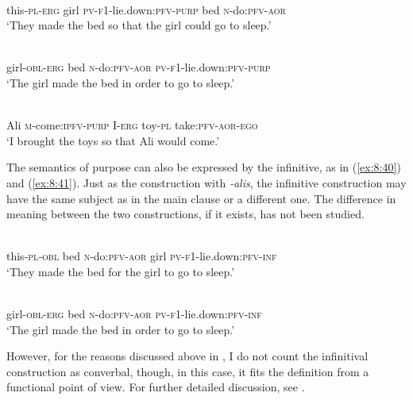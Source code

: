 ﻿\documentclass[output=paper]{langsci/langscibook}
\begin{document}
\ea \label{ex:8:37} %
\\
this-\textsc{pl}-\textsc{erg} girl \textsc{pv}-\textsc{f1}-lie.down:\textsc{pfv}-\textsc{purp} bed \textsc{n}-do:\textsc{pfv}-\textsc{aor}\\
\glt `They made the bed so that the girl could go to sleep.'

\ex \label{ex:8:38} %
\\
girl-\textsc{obl}-\textsc{erg} bed \textsc{n}-do:\textsc{pfv}-\textsc{aor} \textsc{pv}-\textsc{f1}-lie.down:\textsc{pfv}-\textsc{purp}\\
\glt `The girl made the bed in order to go to sleep.'

\ex \label{ex:8:39} %
\\
Ali \textsc{m}-come:\textsc{ipfv}-\textsc{purp} I-\textsc{erg} toy-\textsc{pl} take:\textsc{pfv}-\textsc{aor}-\textsc{ego}\\
\glt `I brought the toys so that Ali would come.'
\z

The semantics of purpose can also be expressed by the infinitive, as in (\ref{ex:8:40}) and (\ref{ex:8:41}). 
Just as the construction with \emph{-alis},
the infinitive construction may have the same subject as in the main clause or a different one. 
The difference in meaning between the two constructions, if it exists, has not been studied.

\ea \label{ex:8:40} %
\\
this-\textsc{pl}-\textsc{obl} bed \textsc{n}-do:\textsc{pfv}-\textsc{aor} girl \textsc{pv}-\textsc{f1}-lie.down:\textsc{pfv}-\textsc{inf}\\
\glt `They made the bed for the girl to go to sleep.'

\ex \label{ex:8:41} %
\\
girl-\textsc{obl}-\textsc{erg} bed \textsc{n}-do:\textsc{pfv}-\textsc{aor} \textsc{pv}-\textsc{f1}-lie.down:\textsc{pfv}-\textsc{inf}\\
\glt `The girl made the bed in order to go to sleep.'
\z

However, for the reasons discussed above in , I do not count
the infinitival construction as converbal, though, in this case,
it fits the definition from a functional point of view. For further
detailed discussion, see \citet[28]{haspelmath1995a}.
\end{document}
